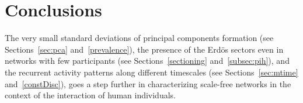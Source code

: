 \documentclass[%
	aip,
	jmp,%
	amsmath,amssymb,
	reprint,%
]{revtex4-1}
\begin{document}

																																																																																					\section{Conclusions}\label{sec:conc}
																																																																																					The very small standard deviations of principal components formation
																																																																																					(see Sections~\ref{sec:pca} and~\ref{prevalence}),
																																																																																					the presence of the Erd\"os sectors even in networks with
																																																																																					few participants (see Sections~\ref{sectioning} and~\ref{subsec:pih}),
																																																																																					and the recurrent activity patterns along different timescales (see Sections~\ref{sec:mtime} and~\ref{constDisc}),
																																																																																					goes a step further in characterizing scale-free networks in the context
																																																																																					of the interaction of human individuals.
\end{document}

